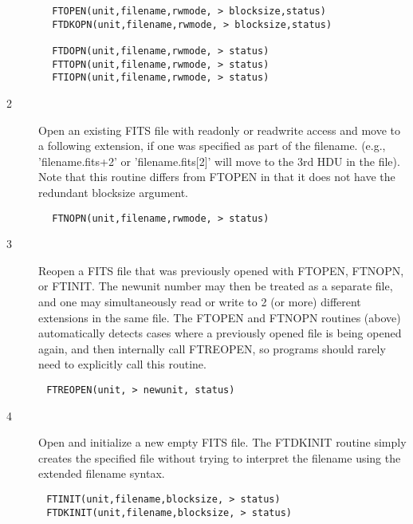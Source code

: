 \documentclass[11pt]{book}
\begin{document}
\begin{verbatim}
        FTOPEN(unit,filename,rwmode, > blocksize,status)
        FTDKOPN(unit,filename,rwmode, > blocksize,status)

        FTDOPN(unit,filename,rwmode, > status)
        FTTOPN(unit,filename,rwmode, > status)
        FTIOPN(unit,filename,rwmode, > status)
\end{verbatim}


\begin{description}
\item[2 ]Open an existing FITS file with readonly or readwrite access
   and move to a following extension, if one was specified as
   part of the filename.  (e.g.,  'filename.fits+2' or
   'filename.fits[2]' will move to the 3rd HDU in the file).
   Note that this routine differs from FTOPEN in that it does not
  have the redundant blocksize argument.
\end{description}

\begin{verbatim}
        FTNOPN(unit,filename,rwmode, > status)
\end{verbatim}

\begin{description}
\item[3 ] Reopen a FITS file that was previously opened with
    FTOPEN, FTNOPN, or FTINIT.  The newunit number
    may then be treated as a separate file, and one may
    simultaneously read or write to 2 (or more)  different extensions in
    the same file.   The FTOPEN and FTNOPN routines (above) automatically
    detects cases where a previously opened file is being opened again,
    and then internally call FTREOPEN, so programs should rarely
   need to explicitly call this routine.
\end{description}

\begin{verbatim}
       FTREOPEN(unit, > newunit, status)
\end{verbatim}

\begin{description}
\item[4 ]Open and initialize a new empty FITS file.
   The FTDKINIT routine simply creates the specified
   file without trying to interpret the filename using the extended
  filename syntax.
\end{description}

\begin{verbatim}
       FTINIT(unit,filename,blocksize, > status)
       FTDKINIT(unit,filename,blocksize, > status)
\end{verbatim}
\end{document}
